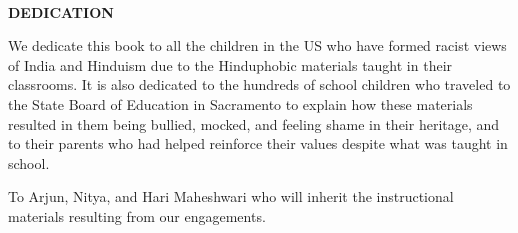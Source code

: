 \thispagestyle{empty}
~
\vfill
\begin{center}
\parbox{0.8\textwidth}{%
\centerline{\textbf{DEDICATION}}
\medskip

We dedicate this book to all the children in the US who have
formed racist views of India and Hinduism due to the Hinduphobic
materials taught in their classrooms.
It is also dedicated to the hundreds of school children who traveled
to the State Board of Education in Sacramento to explain how
these materials resulted in them being bullied, mocked, and feeling
shame in their heritage, and to their parents who had helped
reinforce their values despite what was taught in school.


To Arjun, Nitya, and Hari Maheshwari
who will inherit the instructional materials resulting from our
engagements.}
\end{center}
\vfill
